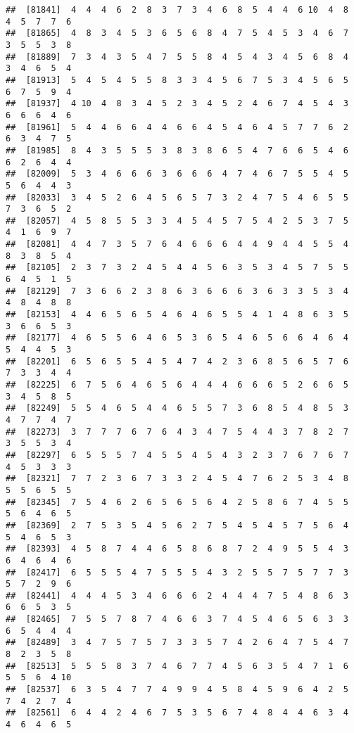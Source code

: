 \documentclass[
]{book}
\begin{document}
\begin{verbatim}
##  [81841]  4  4  4  6  2  8  3  7  3  4  6  8  5  4  4  6 10  4  8  4  5  7  7  6
##  [81865]  4  8  3  4  5  3  6  5  6  8  4  7  5  4  5  3  4  6  7  3  5  5  3  8
##  [81889]  7  3  4  3  5  4  7  5  5  8  4  5  4  3  4  5  6  8  4  3  4  6  5  4
##  [81913]  5  4  5  4  5  5  8  3  3  4  5  6  7  5  3  4  5  6  5  6  7  5  9  4
##  [81937]  4 10  4  8  3  4  5  2  3  4  5  2  4  6  7  4  5  4  3  6  6  6  4  6
##  [81961]  5  4  4  6  6  4  4  6  6  4  5  4  6  4  5  7  7  6  2  6  3  4  7  5
##  [81985]  8  4  3  5  5  5  3  8  3  8  6  5  4  7  6  6  5  4  6  6  2  6  4  4
##  [82009]  5  3  4  6  6  6  3  6  6  6  4  7  4  6  7  5  5  4  5  5  6  4  4  3
##  [82033]  3  4  5  2  6  4  5  6  5  7  3  2  4  7  5  4  6  5  5  7  3  6  5  2
##  [82057]  4  5  8  5  5  3  3  4  5  4  5  7  5  4  2  5  3  7  5  4  1  6  9  7
##  [82081]  4  4  7  3  5  7  6  4  6  6  6  4  4  9  4  4  5  5  4  8  3  8  5  4
##  [82105]  2  3  7  3  2  4  5  4  4  5  6  3  5  3  4  5  7  5  5  6  4  5  1  5
##  [82129]  7  3  6  6  2  3  8  6  3  6  6  6  3  6  3  3  5  3  4  4  8  4  8  8
##  [82153]  4  4  6  5  6  5  4  6  4  6  5  5  4  1  4  8  6  3  5  3  6  6  5  3
##  [82177]  4  6  5  5  6  4  6  5  3  6  5  4  6  5  6  6  4  6  4  5  4  4  5  3
##  [82201]  6  5  6  5  5  4  5  4  7  4  2  3  6  8  5  6  5  7  6  7  3  3  4  4
##  [82225]  6  7  5  6  4  6  5  6  4  4  4  6  6  6  5  2  6  6  5  3  4  5  8  5
##  [82249]  5  5  4  6  5  4  4  6  5  5  7  3  6  8  5  4  8  5  3  4  7  7  4  7
##  [82273]  3  7  7  7  6  7  6  4  3  4  7  5  4  4  3  7  8  2  7  3  5  5  3  4
##  [82297]  6  5  5  5  7  4  5  5  4  5  4  3  2  3  7  6  7  6  7  4  5  3  3  3
##  [82321]  7  7  2  3  6  7  3  3  2  4  5  4  7  6  2  5  3  4  8  5  5  6  5  5
##  [82345]  7  5  4  6  2  6  5  6  5  6  4  2  5  8  6  7  4  5  5  5  6  4  6  5
##  [82369]  2  7  5  3  5  4  5  6  2  7  5  4  5  4  5  7  5  6  4  5  4  6  5  3
##  [82393]  4  5  8  7  4  4  6  5  8  6  8  7  2  4  9  5  5  4  3  6  4  6  4  6
##  [82417]  6  5  5  5  4  7  5  5  5  4  3  2  5  5  7  5  7  7  3  5  7  2  9  6
##  [82441]  4  4  4  5  3  4  6  6  6  2  4  4  4  7  5  4  8  6  3  6  6  5  3  5
##  [82465]  7  5  5  7  8  7  4  6  6  3  7  4  5  4  6  5  6  3  3  6  5  4  4  4
##  [82489]  3  4  7  5  7  5  7  3  3  5  7  4  2  6  4  7  5  4  7  8  2  3  5  8
##  [82513]  5  5  5  8  3  7  4  6  7  7  4  5  6  3  5  4  7  1  6  5  5  6  4 10
##  [82537]  6  3  5  4  7  7  4  9  9  4  5  8  4  5  9  6  4  2  5  7  4  2  7  4
##  [82561]  6  4  4  2  4  6  7  5  3  5  6  7  4  8  4  4  6  3  4  4  6  4  6  5

\end{verbatim}
\end{document}
